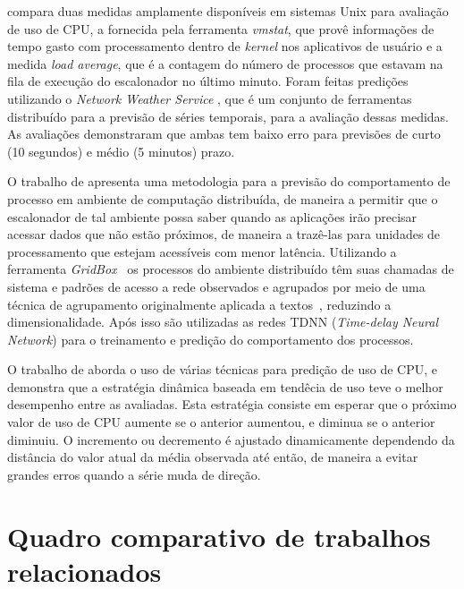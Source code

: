  compara duas medidas amplamente disponíveis
em sistemas Unix para avaliação de uso de CPU, a fornecida pela ferramenta
\emph{vmstat}, que provê informações de tempo gasto com processamento
dentro de \emph{kernel} nos aplicativos de usuário e a medida \emph{load
average}, que é a contagem do número de processos que estavam na fila de
execução do escalonador no último minuto. Foram feitas predições utilizando
o \emph{Network Weather Service} \cite{wolski1999network}, que é um
conjunto de ferramentas distribuído para a previsão de séries temporais,
para a avaliação dessas medidas. As avaliações demonstraram que ambas tem
baixo erro para previsões de curto (10 segundos) e médio (5 minutos) prazo.

O trabalho de  apresenta uma metodologia para a
previsão do comportamento de processo em ambiente de computação distribuída, de
maneira a permitir que o escalonador de tal ambiente possa saber quando as
aplicações irão precisar acessar dados que não estão próximos, de maneira a
trazê-las para unidades de processamento que estejam acessíveis com menor
latência. Utilizando a ferramenta \emph{GridBox}~\cite{dodonov2004gridbox} os
processos do ambiente distribuído têm suas chamadas de sistema e padrões de
acesso a rede observados e agrupados por meio de uma técnica de agrupamento
originalmente aplicada a textos~\cite{de2005automatic}, reduzindo a
dimensionalidade. Após isso são utilizadas as redes TDNN (\emph{Time-delay
Neural Network}) para o treinamento e predição do comportamento dos processos.

O trabalho de  aborda o uso de várias técnicas
para predição de uso de CPU, e demonstra que a estratégia dinâmica baseada em
tendêcia de uso teve o melhor desempenho entre as avaliadas. Esta estratégia
consiste em esperar que o próximo valor de uso de CPU aumente se o anterior
aumentou, e diminua se o anterior diminuiu. O incremento ou decremento é
ajustado dinamicamente dependendo da distância do valor atual da média observada
até então, de maneira a evitar grandes erros quando a série muda de direção.

\section{Quadro comparativo de trabalhos relacionados}

